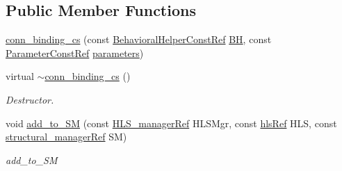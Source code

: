 \subsection*{Public Member Functions}
\begin{DoxyCompactItemize}
\item 
\hyperlink{classconn__binding__cs_a6771b62e0aee17c9241b2350635a017e}{conn\+\_\+binding\+\_\+cs} (const \hyperlink{behavioral__helper_8hpp_aae973b54cac87eef3b27442aa3e1e425}{Behavioral\+Helper\+Const\+Ref} \hyperlink{classconn__binding_a10ef50de9953e2267264484077bdbfdb}{BH}, const \hyperlink{Parameter_8hpp_a37841774a6fcb479b597fdf8955eb4ea}{Parameter\+Const\+Ref} \hyperlink{classconn__binding_a2fea3ae9e3d6941856636531c50c6ff6}{parameters})
\item 
virtual \hyperlink{classconn__binding__cs_af78b42a44ece4f56759e9c1870bc2aeb}{$\sim$conn\+\_\+binding\+\_\+cs} ()
\begin{DoxyCompactList}\small\item\em Destructor. \end{DoxyCompactList}\item 
void \hyperlink{classconn__binding__cs_a1ab5041953556d30503a795859c3121c}{add\+\_\+to\+\_\+\+SM} (const \hyperlink{hls__manager_8hpp_acd3842b8589fe52c08fc0b2fcc813bfe}{H\+L\+S\+\_\+manager\+Ref} H\+L\+S\+Mgr, const \hyperlink{hls_8hpp_a75d0c73923d0ddfa28c4843a802c73a7}{hls\+Ref} H\+LS, const \hyperlink{structural__manager_8hpp_ab3136f0e785d8535f8d252a7b53db5b5}{structural\+\_\+manager\+Ref} SM)
\begin{DoxyCompactList}\small\item\em add\+\_\+to\+\_\+\+SM \end{DoxyCompactList}\end{DoxyCompactItemize}
